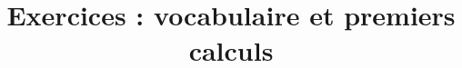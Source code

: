 \documentclass[
	classe=$2^{de}$
]{exercice}
\title{Exercices : vocabulaire et premiers calculs}
\begin{document}
\maketitle

\begin{exercice}
\end{exercice}
\end{document}
